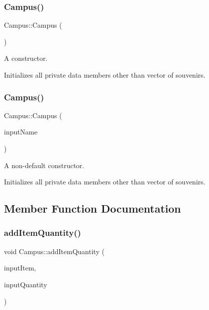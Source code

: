 \subsubsection{\texorpdfstring{Campus()}{Campus()}\hspace{0.1cm}{\footnotesize\ttfamily [1/2]}}
{\footnotesize\ttfamily Campus\+::\+Campus (\begin{DoxyParamCaption}{ }\end{DoxyParamCaption})}



A constructor. 

Initializes all private data members other than vector of souvenirs. \mbox{\label{class_campus_afd0eebcf5837173c3fcb1309a2adce35}} 
\subsubsection{\texorpdfstring{Campus()}{Campus()}\hspace{0.1cm}{\footnotesize\ttfamily [2/2]}}
{\footnotesize\ttfamily Campus\+::\+Campus (\begin{DoxyParamCaption}\item[{Q\+String}]{input\+Name }\end{DoxyParamCaption})}



A non-\/default constructor. 

Initializes all private data members other than vector of souvenirs. 

\subsection{Member Function Documentation}
\mbox{\label{class_campus_afc08eb098c08a751e60b5b643c2d0e81}} 
\subsubsection{\texorpdfstring{add\+Item\+Quantity()}{addItemQuantity()}}
{\footnotesize\ttfamily void Campus\+::add\+Item\+Quantity (\begin{DoxyParamCaption}\item[{Q\+String}]{input\+Item,  }\item[{int}]{input\+Quantity }\end{DoxyParamCaption})}



